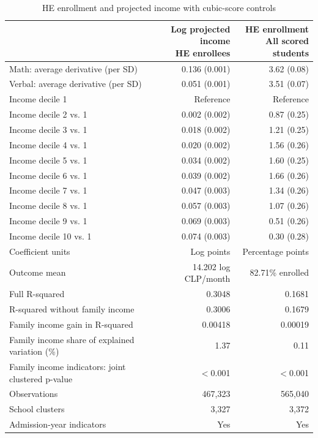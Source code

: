 \begin{table}[!htbp]\centering
\caption{HE enrollment and projected income with cubic-score controls}
\label{tab:income-enrollment-cubic-income}
\small
\begin{tabular}{lrr}\hline\hline
 & \shortstack{Log projected income\\HE enrollees} & \shortstack{HE enrollment\\All scored students} \\ \hline
Math: average derivative (per SD) & 0.136 (0.001) & 3.62 (0.08) \\
Verbal: average derivative (per SD) & 0.051 (0.001) & 3.51 (0.07) \\
Income decile 1 & Reference & Reference \\
Income decile 2 vs. 1 & 0.002 (0.002) & 0.87 (0.25) \\
Income decile 3 vs. 1 & 0.018 (0.002) & 1.21 (0.25) \\
Income decile 4 vs. 1 & 0.020 (0.002) & 1.56 (0.26) \\
Income decile 5 vs. 1 & 0.034 (0.002) & 1.60 (0.25) \\
Income decile 6 vs. 1 & 0.039 (0.002) & 1.66 (0.26) \\
Income decile 7 vs. 1 & 0.047 (0.003) & 1.34 (0.26) \\
Income decile 8 vs. 1 & 0.057 (0.003) & 1.07 (0.26) \\
Income decile 9 vs. 1 & 0.069 (0.003) & 0.51 (0.26) \\
Income decile 10 vs. 1 & 0.074 (0.003) & 0.30 (0.28) \\
\hline
Coefficient units & Log points & Percentage points \\
Outcome mean & 14.202 log CLP/month & 82.71\% enrolled \\
Full R-squared & 0.3048 & 0.1681 \\
R-squared without family income & 0.3006 & 0.1679 \\
Family income gain in R-squared & 0.00418 & 0.00019 \\
Family income share of explained variation (\%) & 1.37 & 0.11 \\
Family income indicators: joint clustered p-value & $<$0.001 & $<$0.001 \\
Observations & 467,323 & 565,040 \\
School clusters & 3,327 & 3,372 \\
Admission-year indicators & Yes & Yes \\
\hline\hline\end{tabular}

\end{table}
